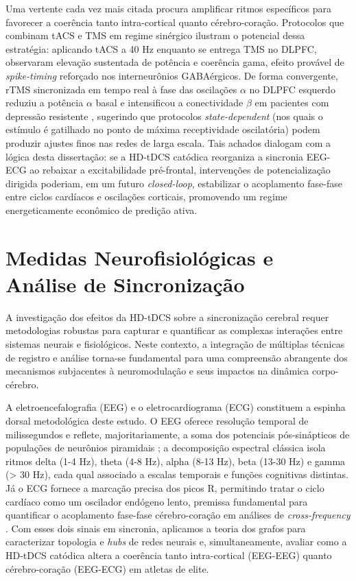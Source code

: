 Uma vertente cada vez mais citada procura amplificar ritmos específicos para favorecer a coerência tanto intra-cortical quanto cérebro-coração. Protocolos que combinam tACS e TMS em regime sinérgico ilustram o potencial dessa estratégia: aplicando tACS a 40 Hz enquanto se entrega TMS no DLPFC,  observaram elevação sustentada de potência e coerência gama, efeito provável de \emph{spike-timing} reforçado nos interneurônios GABAérgicos. De forma convergente, rTMS sincronizada em tempo real à fase das oscilações $\alpha$ no DLPFC esquerdo reduziu a potência $\alpha$ basal e intensificou a conectividade $\beta$ em pacientes com depressão resistente \cite{zrenner2020brain}, sugerindo que protocolos \emph{state-dependent} (nos quais o estímulo é gatilhado no ponto de máxima receptividade oscilatória) podem produzir ajustes finos nas redes de larga escala. Tais achados dialogam com a lógica desta dissertação: se a HD-tDCS catódica reorganiza a sincronia EEG-ECG ao rebaixar a excitabilidade pré-frontal, intervenções de potencialização dirigida poderiam, em um futuro \emph{closed-loop}, estabilizar o acoplamento fase-fase entre ciclos cardíacos e oscilações corticais, promovendo um regime energeticamente econômico de predição ativa.


\section{Medidas Neurofisiológicas e Análise de Sincronização}
A investigação dos efeitos da HD-tDCS sobre a sincronização cerebral requer metodologias robustas para capturar e quantificar as complexas interações entre sistemas neurais e fisiológicos. Neste contexto, a integração de múltiplas técnicas de registro e análise torna-se fundamental para uma compreensão abrangente dos mecanismos subjacentes à neuromodulação e seus impactos na dinâmica corpo-cérebro.

A eletroencefalografia (EEG) e o eletrocardiograma (ECG) constituem a espinha dorsal metodológica deste estudo. O EEG oferece resolução temporal de milissegundos e reflete, majoritariamente, a soma dos potenciais pós-sinápticos de populações de neurônios piramidais \cite{cohen2017where}; a decomposição espectral clássica isola ritmos delta (1-4 Hz), theta (4-8 Hz), alpha (8-13 Hz), beta (13-30 Hz) e gamma (> 30 Hz), cada qual associado a escalas temporais e funções cognitivas distintas. Já o ECG fornece a marcação precisa dos picos R, permitindo tratar o ciclo cardíaco como um oscilador endógeno lento, premissa fundamental para quantificar o acoplamento fase-fase cérebro-coração em análises de \textit{cross-frequency} \cite{criscuolo2022cognition,park2018neural}. Com esses dois sinais em sincronia, aplicamos a teoria dos grafos para caracterizar topologia e \textit{hubs} de redes neurais \cite{bullmore2009complex} e, simultaneamente, avaliar como a HD-tDCS catódica altera a coerência tanto intra-cortical (EEG-EEG) quanto cérebro-coração (EEG-ECG) em atletas de elite.

